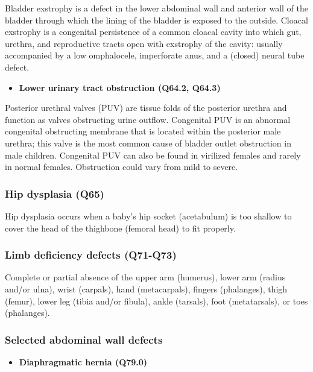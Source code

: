\documentclass[
]{krantz}
\providecommand{\tightlist}{%
  \setlength{\itemsep}{0pt}\setlength{\parskip}{0pt}}
\begin{document}
Bladder exstrophy is a defect in the lower abdominal wall and anterior wall of the bladder through which the lining of the bladder is exposed to the outside. Cloacal exstrophy is a congenital persistence of a common cloacal cavity into which gut, urethra, and reproductive tracts open with exstrophy of the cavity: usually accompanied by a low omphalocele, imperforate anus, and a (closed) neural tube defect.

\begin{itemize}
\tightlist
\item
  \textbf{Lower urinary tract obstruction (Q64.2, Q64.3)}
\end{itemize}

Posterior urethral valves (PUV) are tissue folds of the posterior urethra and function as valves obstructing urine outflow. Congenital PUV is an abnormal congenital obstructing membrane that is located within the posterior male urethra; this valve is the most common cause of bladder outlet obstruction in male children. Congenital PUV can also be found in virilized females and rarely in normal females. Obstruction could vary from mild to severe.

\hypertarget{section2119}{%
\subsubsection{Hip dysplasia (Q65)}\label{section2119}}

Hip dysplasia occurs when a baby's hip socket (acetabulum) is too shallow to cover the head of the thighbone (femoral head) to fit properly.

\hypertarget{section21110}{%
\subsubsection{Limb deficiency defects (Q71-Q73)}\label{section21110}}

Complete or partial absence of the upper arm (humerus), lower arm (radius and/or ulna), wrist (carpals), hand (metacarpals), fingers (phalanges), thigh (femur), lower leg (tibia and/or fibula), ankle (tarsals), foot (metatarsals), or toes (phalanges).

\hypertarget{section21111}{%
\subsubsection{Selected abdominal wall defects}\label{section21111}}

\begin{itemize}
\tightlist
\item
  \textbf{Diaphragmatic hernia (Q79.0)}
\end{itemize}
\end{document}
